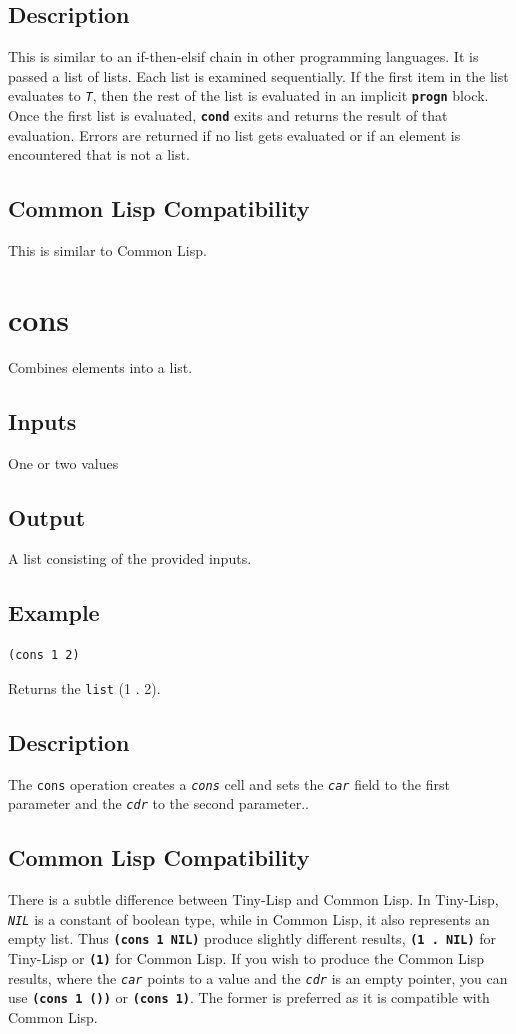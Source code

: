 \documentclass[10pt, openany]{book}
\newcommand{\operation}[1]{\textbf{\texttt{#1}}}
\newcommand{\function}[1]{\texttt{#1}}
\newcommand{\constant}[1]{\emph{\texttt{#1}}}
\newcommand{\datatype}[1]{\texttt{#1}}
\newcommand{\tl}{Tiny-Lisp}
\newcommand{\cl}{Common Lisp}
\begin{document}
\subsection{Description}
This is similar to an if-then-elsif chain in other programming languages.  It is passed a list of lists.  Each list is examined sequentially.  If the first item in the list evaluates to \constant{T}, then the rest of the list is evaluated in an implicit \operation{progn} block.  Once the first list is evaluated, \operation{cond} exits and returns the result of that evaluation.  Errors are returned if no list gets evaluated or if an element is encountered that is not a list.
\subsection{Common Lisp Compatibility}
This is similar to \cl{}.

\section{cons}
Combines elements into a list.
\subsection{Inputs}
One or two values
\subsection{Output}
A list consisting of the provided inputs.
\subsection{Example}
\begin{lstlisting}
(cons 1 2)
\end{lstlisting}
Returns the \datatype{list} (1 . 2).
\subsection{Description}
The \function{cons} operation creates a \constant{cons} cell and sets the \constant{car} field to the first parameter and the \constant{cdr} to the second parameter..
\subsection{Common Lisp Compatibility}
There is a subtle difference between \tl{} and \cl.  In \tl, \constant{NIL} is a constant of boolean type, while in \cl, it also represents an empty list.  Thus \operation{(cons 1 NIL)} produce slightly different results, \operation{(1 . NIL)} for \tl{} or \operation{(1)} for \cl.  If you wish to produce the \cl{} results, where the \constant{car} points to a value and the \constant{cdr} is an empty pointer, you can use \operation{(cons 1 ())} or \operation{(cons 1)}.  The former is preferred as it is compatible with \cl.
\end{document}
